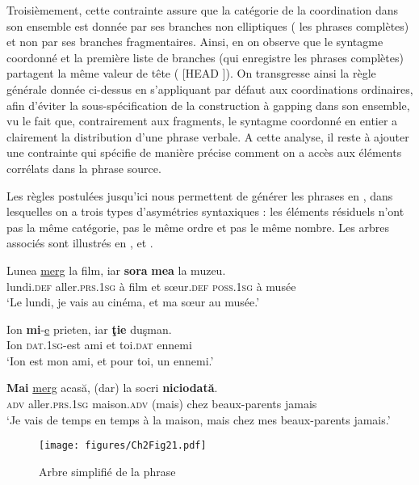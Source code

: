 Troisièmement, cette contrainte assure que la catégorie de la coordination dans son ensemble est donnée par ses branches non elliptiques ({\cad} les phrases complètes) et non par ses branches fragmentaires. Ainsi, en  on observe que le syntagme coordonné et la première liste de branches (qui enregistre les phrases complètes) partagent la même valeur de tête ({\cad} [HEAD ]). On transgresse ainsi la règle générale donnée ci-dessus en  s’appliquant par défaut aux coordinations ordinaires, afin d’éviter la sous-spécification de la construction à gapping dans son ensemble, vu le fait que, contrairement aux fragments, le syntagme coordonné en entier a clairement la distribution d’une phrase verbale. A cette analyse, il reste à ajouter une contrainte qui spécifie de manière précise comment on a accès aux éléments corrélats dans la phrase source. 

Les règles postulées jusqu’ici nous permettent de générer les phrases en , dans lesquelles on a trois types d’asymétries syntaxiques : les éléments résiduels n’ont pas la même catégorie, pas le même ordre et pas le même nombre. Les arbres associés sont illustrés en ,  et . 

\ea \label{ch2:ex277}
\ea 
\gll Lunea  \uline{merg}  la  film,  iar  \textbf{sora} \textbf{mea}  la  muzeu. \label{ch2:ex277a}\\
lundi.\textsc{def} aller.\textsc{prs.1sg} à  film  et  sœur.\textsc{def} \textsc{poss.1sg}  à  musée\\ 
\glt ‘Le lundi, je vais au cinéma, et ma sœur au musée.’

\ex 
\gll Ion  \textbf{mi}{}-\uline{e} prieten,  iar  \textbf{ţie}  duşman. \label{ch2:ex277b}\\ 
Ion  \textsc{dat.1sg}-est  ami  et  toi.\textsc{dat} ennemi\\ 
\glt ‘Ion est mon ami, et pour toi, un ennemi.’

\ex 
\gll \textbf{Mai}  \uline{merg} acasă,  (dar)  la  socri  \textbf{niciodată}. \label{ch2:ex277c}\\
\textsc{adv}  aller.\textsc{prs.1sg}  maison.\textsc{adv}  (mais)  chez  beaux-parents  jamais\\ 
\glt ‘Je vais de temps en temps à la maison, mais chez mes beaux-parents jamais.’ 
\z
\z


\begin{sidewaysfigure} 
\texttt{[image: figures/Ch2Fig21.pdf]}%
\caption{Arbre simplifié de la phrase }
\label{ch2:fig21}
\end{sidewaysfigure}


